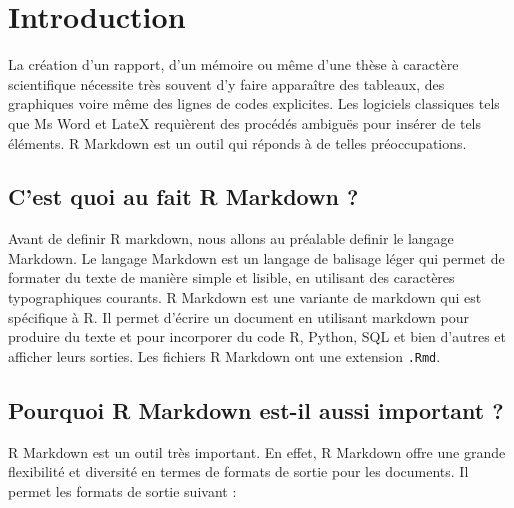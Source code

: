 \documentclass[
  12pt,
]{article}
\begin{document}
\section{Introduction}\label{introduction}

La création d'un rapport, d'un mémoire ou même d'une thèse à caractère
scientifique nécessite très souvent d'y faire apparaître des tableaux,
des graphiques voire même des lignes de codes explicites. Les logiciels
classiques tels que Ms Word et LateX requièrent des procédés ambiguës
pour insérer de tels éléments. R Markdown est un outil qui réponds à de
telles préoccupations.

\subsection{C'est quoi au fait R Markdown
?}\label{cest-quoi-au-fait-r-markdown}

Avant de definir R markdown, nous allons au préalable definir le langage
Markdown. Le langage Markdown est un langage de balisage léger qui
permet de formater du texte de manière simple et lisible, en utilisant
des caractères typographiques courants. R Markdown est une variante de
markdown qui est spécifique à R. Il permet d'écrire un document en
utilisant markdown pour produire du texte et pour incorporer du code R,
Python, SQL et bien d'autres et afficher leurs sorties. Les fichiers R
Markdown ont une extension \texttt{.Rmd}.

\subsection{Pourquoi R Markdown est-il aussi important
?}\label{pourquoi-r-markdown-est-il-aussi-important}

R Markdown est un outil très important. En effet, R Markdown offre une
grande flexibilité et diversité en termes de formats de sortie pour les
documents. Il permet les formats de sortie suivant :
\end{document}
